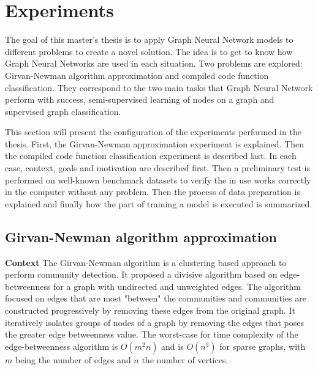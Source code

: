 \newpage
\section{Experiments}

The goal of this master's thesis is to apply Graph Neural Network models to different problems to create a novel solution. The idea is to get to know how Graph Neural Networks are used in each situation. Two problems are explored: Girvan-Newman algorithm approximation and compiled code function classification. They correspond to the two main tasks that Graph Neural Network perform with success, semi-supervised learning of nodes on a graph and supervised graph classification. 

This section will present the configuration of the experiments performed in the thesis. First, the Girvan-Newman approximation experiment is explained. Then the compiled code function classification experiment is described last. In each case, context, goals and motivation are described first. Then a preliminary test is performed on well-known benchmark datasets to verify the in use works correctly in the computer without any problem. Then the process of data preparation is explained and finally how the part of training a model is executed is summarized.

\subsection{Girvan-Newman algorithm approximation}

\textbf{Context} 
The Girvan-Newman algorithm is a clustering based approach to perform community detection. It proposed a divisive algorithm based on edge-betweenness for a graph with undirected and unweighted edges. The algorithm focused on edges that are most "between" the communities and communities are constructed progressively by removing these edges from the original graph. It iteratively isolates groups of nodes of a graph by removing the edges that poses the greater edge betweenness value. The worst-case for time complexity of the edge-betweenness algorithm is $O(m^2n)$ and is $O(n^3)$ for sparse graphs, with $m$ being the number of edges and $n$ the number of vertices. 

